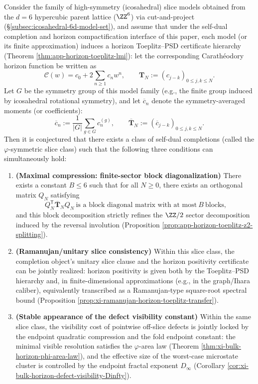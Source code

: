 \begin{conjecture}\label{conj:discussion-phi-symmetric-slice-extremal}
Consider the family of high-symmetry (icosahedral) slice models obtained from the \(d=6\) hypercubic parent lattice (\(\ZZ^6\)) via cut-and-project (\S\ref{subsec:icosahedral-6d-model-set}), and assume that under the self-dual completion and horizon compactification interface of this paper, each model (or its finite approximation) induces a horizon Toeplitz--PSD certificate hierarchy (Theorem \ref{thm:app-horizon-toeplitz-lmi}): let the corresponding Carath\'eodory horizon function be written as
\[
\mathscr{C}(w)=c_0+2\sum_{n\ge 1}c_n w^n,\qquad
\mathbf{T}_N:=(c_{j-k})_{0\le j,k\le N}.
\]
Let \(G\) be the symmetry group of this model family (e.g., the finite group induced by icosahedral rotational symmetry), and let \(\overline c_n\) denote the symmetry-averaged moments (or coefficients):
\[
\overline c_n:=\frac{1}{|G|}\sum_{g\in G} c_n^{(g)},
\qquad
\overline{\mathbf{T}}_N:=(\overline c_{j-k})_{0\le j,k\le N}.
\]
Then it is conjectured that there exists a class of self-dual completions (called the \(\varphi\)-symmetric slice class) such that the following three conditions can simultaneously hold:
\begin{enumerate}
  \item \textbf{(Maximal compression: finite-sector block diagonalization)}
  There exists a constant \(B\le 6\) such that for all \(N\ge 0\), there exists an orthogonal matrix \(Q_N\) satisfying
  \[
  Q_N^{\mathsf T}\overline{\mathbf{T}}_N Q_N
  \ \text{is a block diagonal matrix with at most}\ B\ \text{blocks,}
  \]
  and this block decomposition strictly refines the \(\ZZ/2\) sector decomposition induced by the reversal involution (Proposition \ref{prop:app-horizon-toeplitz-z2-splitting}).
  \item \textbf{(Ramanujan/unitary slice consistency)}
  Within this slice class, the completion object's unitary slice clause and the horizon positivity certificate can be jointly realized: horizon positivity is given both by the Toeplitz--PSD hierarchy and, in finite-dimensional approximations (e.g., in the graph/Ihara caliber), equivalently transcribed as a Ramanujan-type square-root spectral bound (Proposition \ref{prop:xi-ramanujan-horizon-toeplitz-transfer}).
  \item \textbf{(Stable appearance of the defect visibility constant)}
  Within the same slice class, the visibility cost of pointwise off-slice defects is jointly locked by the endpoint quadratic compression and the fold endpoint constant: the minimal visible resolution satisfies the \(\varphi\)-area law (Theorem \ref{thm:xi-bulk-horizon-phi-area-law}), and the effective size of the worst-case microstate cluster is controlled by the endpoint fractal exponent \(D_\infty\) (Corollary \ref{cor:xi-bulk-horizon-defect-visibility-Dinfty}).
\end{enumerate}
\end{conjecture}

